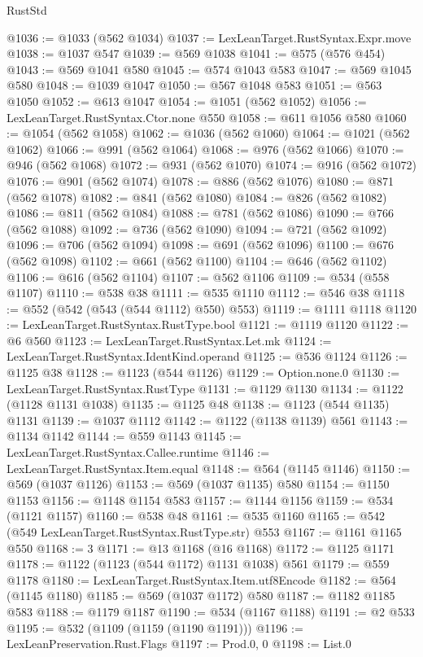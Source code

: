 \begin{lexlean}{RustStd}
\begin{coremodule}
@1036 := @1033 (@562 @1034)
@1037 := LexLeanTarget.RustSyntax.Expr.move
@1038 := @1037 @547
@1039 := @569 @1038
@1041 := @575 (@576 @454)
@1043 := @569 @1041 @580
@1045 := @574 @1043 @583
@1047 := @569 @1045 @580
@1048 := @1039 @1047
@1050 := @567 @1048 @583
@1051 := @563 @1050
@1052 := @613 @1047
@1054 := @1051 (@562 @1052)
@1056 := LexLeanTarget.RustSyntax.Ctor.none @550
@1058 := @611 @1056 @580
@1060 := @1054 (@562 @1058)
@1062 := @1036 (@562 @1060)
@1064 := @1021 (@562 @1062)
@1066 := @991 (@562 @1064)
@1068 := @976 (@562 @1066)
@1070 := @946 (@562 @1068)
@1072 := @931 (@562 @1070)
@1074 := @916 (@562 @1072)
@1076 := @901 (@562 @1074)
@1078 := @886 (@562 @1076)
@1080 := @871 (@562 @1078)
@1082 := @841 (@562 @1080)
@1084 := @826 (@562 @1082)
@1086 := @811 (@562 @1084)
@1088 := @781 (@562 @1086)
@1090 := @766 (@562 @1088)
@1092 := @736 (@562 @1090)
@1094 := @721 (@562 @1092)
@1096 := @706 (@562 @1094)
@1098 := @691 (@562 @1096)
@1100 := @676 (@562 @1098)
@1102 := @661 (@562 @1100)
@1104 := @646 (@562 @1102)
@1106 := @616 (@562 @1104)
@1107 := @562 @1106
@1109 := @534 (@558 @1107)
@1110 := @538 @38
@1111 := @535 @1110
@1112 := @546 @38
@1118 := @552 (@542 (@543 (@544 @1112) @550) @553)
@1119 := @1111 @1118
@1120 := LexLeanTarget.RustSyntax.RustType.bool
@1121 := @1119 @1120
@1122 := @6 @560
@1123 := LexLeanTarget.RustSyntax.Let.mk
@1124 := LexLeanTarget.RustSyntax.IdentKind.operand
@1125 := @536 @1124
@1126 := @1125 @38
@1128 := @1123 (@544 @1126)
@1129 := Option.none.{0}
@1130 := LexLeanTarget.RustSyntax.RustType
@1131 := @1129 @1130
@1134 := @1122 (@1128 @1131 @1038)
@1135 := @1125 @48
@1138 := @1123 (@544 @1135) @1131
@1139 := @1037 @1112
@1142 := @1122 (@1138 @1139) @561
@1143 := @1134 @1142
@1144 := @559 @1143
@1145 := LexLeanTarget.RustSyntax.Callee.runtime
@1146 := LexLeanTarget.RustSyntax.Item.equal
@1148 := @564 (@1145 @1146)
@1150 := @569 (@1037 @1126)
@1153 := @569 (@1037 @1135) @580
@1154 := @1150 @1153
@1156 := @1148 @1154 @583
@1157 := @1144 @1156
@1159 := @534 (@1121 @1157)
@1160 := @538 @48
@1161 := @535 @1160
@1165 := @542 (@549 LexLeanTarget.RustSyntax.RustType.str) @553
@1167 := @1161 @1165 @550
@1168 := 3
@1171 := @13 @1168 (@16 @1168)
@1172 := @1125 @1171
@1178 := @1122 (@1123 (@544 @1172) @1131 @1038) @561
@1179 := @559 @1178
@1180 := LexLeanTarget.RustSyntax.Item.utf8Encode
@1182 := @564 (@1145 @1180)
@1185 := @569 (@1037 @1172) @580
@1187 := @1182 @1185 @583
@1188 := @1179 @1187
@1190 := @534 (@1167 @1188)
@1191 := @2 @533
@1195 := @532 (@1109 (@1159 (@1190 @1191)))
@1196 := LexLeanPreservation.Rust.Flags
@1197 := Prod.{0, 0}
@1198 := List.{0}

\end{coremodule}
\end{lexlean}
